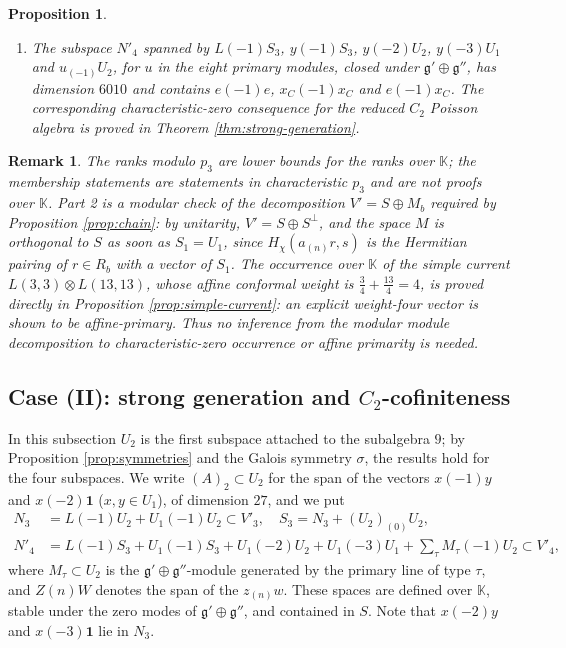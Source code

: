 \documentclass[leqno]{article}
\newcommand{\K}{\ensuremath{\mathbb{K}}}
\newcommand{\ot}{\otimes}
\newtheorem{prop}[thm]{Proposition}
\newtheorem{remark}[thm]{Remark}
\numberwithin{equation}{section}
\begin{document}
\begin{prop}
\begin{enumerate}
\item The subspace $N'_4$ spanned by $L(-1)S_3$, $y(-1)S_3$, $y(-2)U_2$, $y(-3)U_1$ and $u_{(-1)}U_2$, for $u$ in the eight primary modules, closed under $\mathfrak g' \oplus \mathfrak g''$, has dimension $6010$ and contains $e(-1)e$, $x_C(-1)x_C$ and $e(-1)x_C$. The corresponding characteristic-zero consequence for the reduced $C_2$ Poisson algebra is proved in Theorem \ref{thm:strong-generation}.
\end{enumerate}
\end{prop}

\begin{remark}\normalfont
\label{rem:weight-four-meaning}
The ranks modulo $p_3$ are lower bounds for the ranks over $\K$; the membership statements are statements in characteristic $p_3$ and are not proofs over $\K$. Part 2 is a modular check of the decomposition $V' = S \oplus M_b$ required by Proposition \ref{prop:chain}: by unitarity, $V' = S \oplus S^\perp$, and the space $M$ is orthogonal to $S$ as soon as $S_1 = U_1$, since $H_\chi(a_{(n)}r,s)$ is the Hermitian pairing of $r \in R_b$ with a vector of $S_1$. The occurrence over $\K$ of the simple current $L(3,3) \ot L(13,13)$, whose affine conformal weight is $\frac34 + \frac{13}{4} = 4$, is proved directly in Proposition \ref{prop:simple-current}: an explicit weight-four vector is shown to be affine-primary. Thus no inference from the modular module decomposition to characteristic-zero occurrence or affine primarity is needed.
\end{remark}


\subsection{Case (II): strong generation and \texorpdfstring{$C_2$}{C2}-cofiniteness}
\label{subsec:strong-generation}

In this subsection $U_2$ is the first subspace attached to the subalgebra $9$; by Proposition \ref{prop:symmetries} and the Galois symmetry $\sigma$, the results hold for the four subspaces. We write $(A)_2 \subset U_2$ for the span of the vectors $x(-1)y$ and $x(-2)\mathbf 1$ ($x,y \in U_1$), of dimension $27$, and we put
\begin{align*}
N_3 &= L(-1)U_2 + U_1(-1)U_2 \subset V'_3, \quad S_3 = N_3 + (U_2)_{(0)}U_2,\\
N'_4 &= L(-1)S_3 + U_1(-1)S_3 + U_1(-2)U_2 + U_1(-3)U_1 + \textstyle\sum_{\tau} M_\tau(-1)U_2 \subset V'_4,
\end{align*}
where $M_\tau \subset U_2$ is the $\mathfrak g' \oplus \mathfrak g''$-module generated by the primary line of type $\tau$, and $Z(n)W$ denotes the span of the $z_{(n)}w$. These spaces are defined over $\K$, stable under the zero modes of $\mathfrak g' \oplus \mathfrak g''$, and contained in $S$. Note that $x(-2)y$ and $x(-3)\mathbf 1$ lie in $N_3$.
\end{document}
